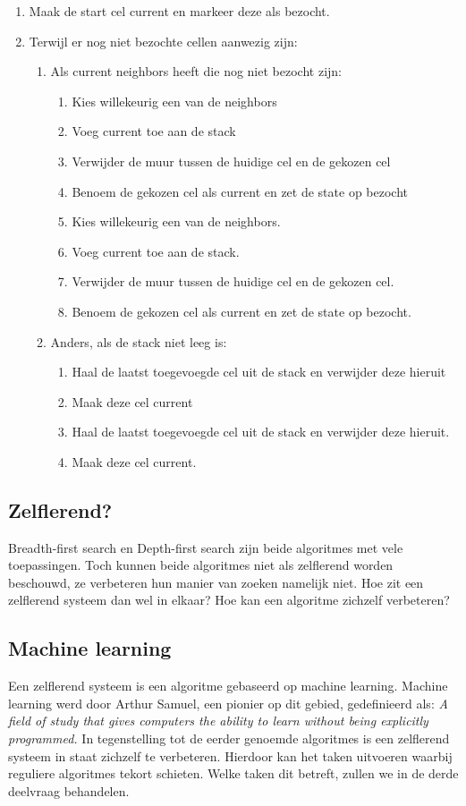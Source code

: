 \begin{enumerate}
\item Maak de start cel current en markeer deze als bezocht.
\item Terwijl er nog niet bezochte cellen aanwezig zijn:
	\begin{enumerate}
	\item Als current neighbors heeft die nog niet bezocht zijn:
		\begin{enumerate}
		\item Kies willekeurig een van de neighbors
		\item Voeg current toe aan de stack
		\item Verwijder de muur tussen de huidige cel en de gekozen cel
		\item Benoem de gekozen cel als current en zet de state op bezocht
		\item Kies willekeurig een van de neighbors.
		\item Voeg current toe aan de stack.
		\item Verwijder de muur tussen de huidige cel en de gekozen cel.
		\item Benoem de gekozen cel als current en zet de state op bezocht.
		\end{enumerate}			
	
	\item Anders, als de stack niet leeg is:
		\begin{enumerate}
		\item Haal de laatst toegevoegde cel uit de stack en verwijder deze hieruit
		\item Maak deze cel current
		\item Haal de laatst toegevoegde cel uit de stack en verwijder deze hieruit.
		\item Maak deze cel current.
		\end{enumerate}	
	\end{enumerate}
\end{enumerate}
\subsection{Zelflerend?}
Breadth-first search en Depth-first search zijn beide algoritmes met vele toepassingen. Toch kunnen beide algoritmes niet als zelflerend worden beschouwd, ze verbeteren hun manier van zoeken namelijk niet. Hoe zit een zelflerend systeem dan wel in elkaar? Hoe kan een algoritme zichzelf verbeteren?

\subsection{Machine learning}
Een zelflerend systeem is een algoritme gebaseerd op machine learning. Machine learning werd door Arthur Samuel, een pionier op dit gebied, gedefinieerd als: 
\textit{A field of study that gives computers the ability to learn without being explicitly programmed.} \cite{ArthurSamuel} 
In tegenstelling tot de eerder genoemde algoritmes is een zelflerend systeem in staat zichzelf te verbeteren. Hierdoor kan het taken uitvoeren waarbij reguliere algoritmes tekort schieten. Welke taken dit betreft, zullen we in de derde deelvraag behandelen. 

